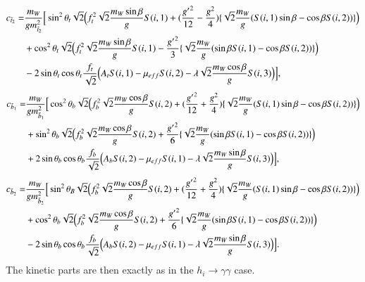 \documentclass[final,3p,times]{elsarticle}
\begin{document}
\begin{equation}
\begin{aligned}
c_{\tilde{t}_2} = & {m_{W} \over g m_{\tilde{t}_2}^2}\Big[\sin^2 \theta_t \sqrt{2}\Big(f_{t}^2\sqrt{2} {m_{W} \sin\beta \over g}S(i,1) + ({{g'}^2 \over 12} - {g^2 \over 4})\{\sqrt{2} {m_{W} \over g}(S(i,1)\sin\beta - \cos\beta S(i,2))\}\Big) \\ & + \cos^2 \theta_t \sqrt{2} \Big(f_{t}^2 \sqrt{2} {m_{W} \sin\beta \over g}S(i,1) - {{g'}^2 \over 3}\{\sqrt{2} {m_{W} \over g}(\sin\beta S(i,1) - \cos\beta S(i,2))\}\Big) \\ & - 2\sin\theta_t \cos\theta_t {f_{t} \over \sqrt{2}}\Big(A_{t}S(i,1) - \mu_{eff}S(i,2) - \lambda\sqrt{2}{m_{W} \cos\beta \over g}S(i,3)\Big)\Big],
\end{aligned}
\end{equation}
\begin{equation}
\begin{aligned}
c_{\tilde{b}_1} = & {m_{W} \over g m_{\tilde{b}_1}^2}\Big[\cos^2 \theta_b \sqrt{2}\Big(f_{b}^2\sqrt{2} {m_{W} \cos\beta \over g}S(i,2) + ({{g'}^2 \over 12} + {g^2 \over 4})\{\sqrt{2} {m_{W} \over g}(S(i,1)\sin\beta - \cos\beta S(i,2))\}\Big) \\ & + \sin^2 \theta_b \sqrt{2} \Big(f_{b}^2 \sqrt{2} {m_{W} \cos\beta \over g}S(i,2) + {{g'}^2 \over 6}\{\sqrt{2} {m_{W} \over g}(\sin\beta S(i,1) - \cos\beta S(i,2))\}\Big) \\ & + 2\sin\theta_b \cos\theta_b {f_{b} \over \sqrt{2}}\Big(A_{b}S(i,2) - \mu_{eff}S(i,1) - \lambda\sqrt{2}{m_{W} \sin\beta \over g}S(i,3)\Big)\Big],
\end{aligned}
\end{equation}
\begin{equation}
\begin{aligned}
c_{\tilde{b}_2} = & {m_{W} \over g m_{\tilde{b}_2}^2}\Big[\sin^2 \theta_B \sqrt{2}\Big(f_{b}^2\sqrt{2} {m_{W} \cos\beta \over g}S(i,2) + ({{g'}^2 \over 12} + {g^2 \over 4})\{\sqrt{2} {m_{W} \over g}(S(i,1)\sin\beta - \cos\beta S(i,2))\}\Big) \\ & + \cos^2 \theta_b \sqrt{2} \Big(f_{b}^2 \sqrt{2} {m_{W} \cos\beta \over g}S(i,2) + {{g'}^2 \over 6}\{\sqrt{2} {m_{W} \over g}(\sin\beta S(i,1) - \cos\beta S(i,2))\}\Big) \\ & - 2\sin\theta_b \cos\theta_b {f_{b} \over \sqrt{2}}\Big(A_{b}S(i,2) - \mu_{eff}S(i,1) - \lambda\sqrt{2}{m_{W} \sin\beta \over g}S(i,3)\Big)\Big].
\end{aligned}
\end{equation}
The kinetic parts are then exactly as in the $h_{i} \rightarrow \gamma \gamma$ case.
\end{document}
